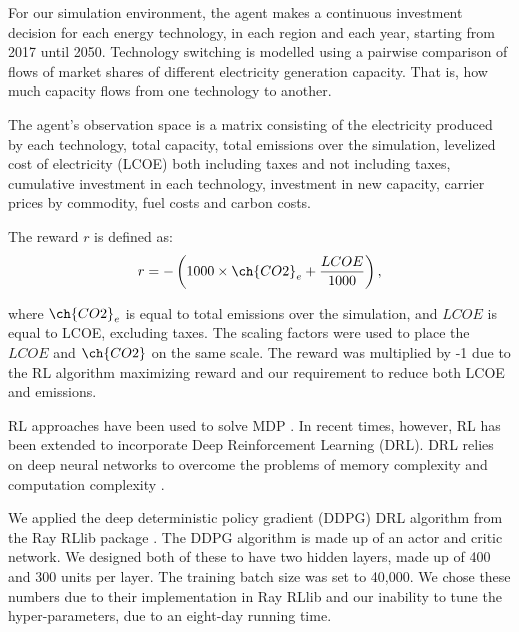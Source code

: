 \documentclass{article}
\begin{document}
For our simulation environment, the agent makes a continuous investment decision for each energy technology, in each region and each year, starting from 2017 until 2050. 	Technology switching is modelled using a pairwise comparison of flows of market shares of different electricity generation capacity. That is, how much capacity flows from one technology to another. 

The agent's observation space is a matrix consisting of the electricity produced by each technology, total capacity, total  emissions over the simulation, levelized cost of electricity (LCOE) both including taxes and not including taxes, cumulative investment in each technology, investment in new capacity, carrier prices by commodity, fuel costs and carbon costs.

The reward $r$ is defined as:
\begin{equation}
	r = -\left(1000\times\ch{CO2}_e + \frac{LCOE}{1000}\right),
\end{equation}

where $\ch{CO2}_e$ is equal to total  emissions over the simulation, and $LCOE$ is equal to LCOE, excluding taxes. The scaling factors were used to place the $LCOE$ and $\ch{CO2}$ on the same scale. The reward was multiplied by -1 due to the RL algorithm maximizing reward and our requirement to reduce both LCOE and  emissions.


RL approaches have been used to solve MDP \cite{Sutton2015}. In recent times, however, RL has been extended to incorporate Deep Reinforcement Learning (DRL). DRL relies on deep neural networks to overcome the problems of memory complexity and computation complexity \cite{Arulkumaran2017}. 

We applied the deep deterministic policy gradient (DDPG) DRL algorithm \cite{Hunt2016a} from the Ray RLlib package \cite{Liang2014}. The DDPG algorithm is made up of an actor and critic network. We designed both of these to have two hidden layers, made up of 400 and 300 units per layer. The training batch size was set to 40,000. We chose these numbers due to their implementation in Ray RLlib and our inability to tune the hyper-parameters, due to an eight-day running time.



\end{document}
